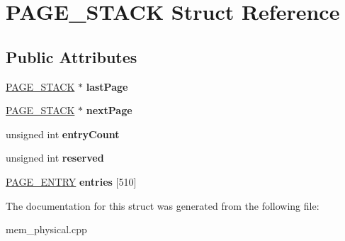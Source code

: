 \hypertarget{struct_p_a_g_e___s_t_a_c_k}{}\section{P\+A\+G\+E\+\_\+\+S\+T\+A\+CK Struct Reference}
\label{struct_p_a_g_e___s_t_a_c_k}
\subsection*{Public Attributes}
\begin{DoxyCompactItemize}
\item 
\mbox{\label{struct_p_a_g_e___s_t_a_c_k_ab5d413fd141e3fd932d632ffbd71b7ff}} 
\hyperlink{struct_p_a_g_e___s_t_a_c_k}{P\+A\+G\+E\+\_\+\+S\+T\+A\+CK} $\ast$ {\bfseries last\+Page}
\item 
\mbox{\label{struct_p_a_g_e___s_t_a_c_k_a682c01f75a7fe68ee6e7ea4fca258443}} 
\hyperlink{struct_p_a_g_e___s_t_a_c_k}{P\+A\+G\+E\+\_\+\+S\+T\+A\+CK} $\ast$ {\bfseries next\+Page}
\item 
\mbox{\label{struct_p_a_g_e___s_t_a_c_k_a80b3c05013c0f41197d87329184da2a7}} 
unsigned int {\bfseries entry\+Count}
\item 
\mbox{\label{struct_p_a_g_e___s_t_a_c_k_a1386a5df4d8338ed84976d809b51d298}} 
unsigned int {\bfseries reserved}
\item 
\mbox{\label{struct_p_a_g_e___s_t_a_c_k_ac3964ea08c421e727ff3495e3e462946}} 
\hyperlink{struct_p_a_g_e___e_n_t_r_y}{P\+A\+G\+E\+\_\+\+E\+N\+T\+RY} {\bfseries entries} \mbox{[}510\mbox{]}
\end{DoxyCompactItemize}


The documentation for this struct was generated from the following file\+:\begin{DoxyCompactItemize}
\item 
mem\+\_\+physical.\+cpp\end{DoxyCompactItemize}

